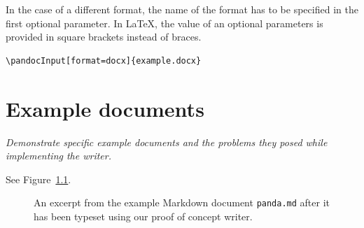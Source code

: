 \documentclass[
  digital,     %
  oneside,     %
  nosansbold,  %
  nocolorbold, %
  lof,         %
  nolot,       %
]{fithesis4}
\begin{document}
\noindent
In the case of a different format, the name of the format has to be specified in the first optional parameter. In \LaTeX{}, the value of an optional parameters is provided in square brackets instead of braces.

\noindent
\lstset{language=[LaTeX]TeX}
\begin{lstlisting}
\pandocInput[format=docx]{example.docx}
\end{lstlisting}

\ifexamples

\chapter{Example documents}
\emph{Demonstrate specific example documents and the problems they posed while implementing the writer.} \label{fig:html-browsers-typeset}

See Figure~\ref{fig:example-panda}.

\begin{figure}[tbhp]
\centering
\caption{An excerpt from the example Markdown document \texttt{panda.md} after it has been typeset using our proof of concept writer.}
\label{fig:example-panda}
\end{figure}
\end{document}
